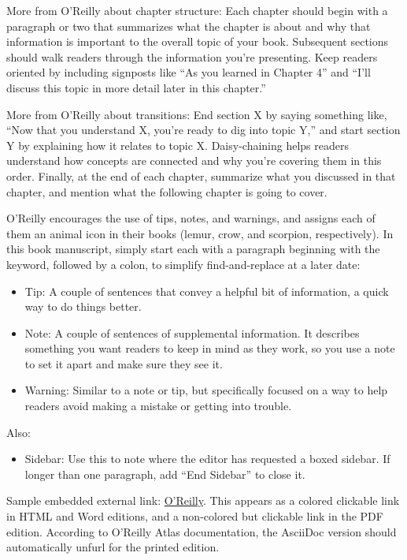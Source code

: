 \documentclass[
  english,
]{book}
\providecommand{\tightlist}{%
  \setlength{\itemsep}{0pt}\setlength{\parskip}{0pt}}
\begin{document}
More from O'Reilly about chapter structure: Each chapter should begin with a paragraph or two that summarizes what the chapter is about and why that information is important to the overall topic of your book. Subsequent sections should walk readers through the information you're presenting. Keep readers oriented by including signposts like ``As you learned in Chapter 4'' and ``I'll discuss this topic in more detail later in this chapter.''

More from O'Reilly about transitions: End section X by saying something like, ``Now that you understand X, you're ready to dig into topic Y,'' and start section Y by explaining how it relates to topic X. Daisy-chaining helps readers understand how concepts are connected and why you're covering them in this order. Finally, at the end of each chapter, summarize what you discussed in that chapter, and mention what the following chapter is going to cover.

O'Reilly encourages the use of tips, notes, and warnings, and assigns each of them an animal icon in their books (lemur, crow, and scorpion, respectively). In this book manuscript, simply start each with a paragraph beginning with the keyword, followed by a colon, to simplify find-and-replace at a later date:

\begin{itemize}
\tightlist
\item
  Tip: A couple of sentences that convey a helpful bit of information, a quick way to do things better.
\item
  Note: A couple of sentences of supplemental information. It describes something you want readers to keep in mind as they work, so you use a note to set it apart and make sure they see it.
\item
  Warning: Similar to a note or tip, but specifically focused on a way to help readers avoid making a mistake or getting into trouble.
\end{itemize}

Also:

\begin{itemize}
\tightlist
\item
  Sidebar: Use this to note where the editor has requested a boxed sidebar. If longer than one paragraph, add ``End Sidebar'' to close it.
\end{itemize}

Sample embedded external link: \href{https://www.oreilly.com/}{O'Reilly}. This appears as a colored clickable link in HTML and Word editions, and a non-colored but clickable link in the PDF edition. According to O'Reilly Atlas documentation, the AsciiDoc version should automatically unfurl for the printed edition.
\end{document}
